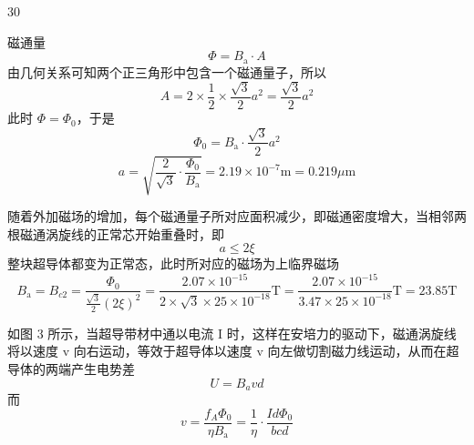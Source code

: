 \begin{solution}{30}
  \begin{subsolution}
    磁通量
    \begin{equation}
      \Phi = B_{\mathrm{a}} \cdot A
      \label{eq:1.p30}
    \end{equation}
    由几何关系可知两个正三角形中包含一个磁通量子，所以
    \begin{equation}
      A = 2 \times \frac{1}{2} \times \frac{\sqrt{3}}{2} a^{2} = \frac{\sqrt{3}}{2} a^{2}
      \label{eq:2.p30}
    \end{equation}
    此时 $\Phi = \Phi_{0}$，于是
    \begin{equation}
      \Phi_{0} = B_{\mathrm{a}} \cdot \frac{\sqrt{3}}{2} a^{2}
      \label{eq:3.p30}
    \end{equation}
    \begin{equation}
      a = \sqrt{\frac{2}{\sqrt{3}} \cdot \frac{\Phi_{0}}{B_{\mathrm{a}}}} = 2.19 \times 10^{-7} \mathrm{m} = 0.219 \mu \mathrm{m}
      \label{eq:4.p30}
    \end{equation}
  \end{subsolution}
  \begin{subsolution}
    随着外加磁场的增加，每个磁通量子所对应面积减少，即磁通密度增大，当相邻两根磁通涡旋线的正常芯开始重叠时，即
    \begin{equation}
      a \leq 2 \xi
      \label{eq:5.p30}
    \end{equation}
    整块超导体都变为正常态，此时所对应的磁场为上临界磁场
    \begin{equation}
      B_{\mathrm{a}} = B_{c 2} = \frac{\Phi_{0}}{\frac{\sqrt{3}}{2} (2 \xi)^{2}} = \frac{2.07 \times 10^{-15}}{2 \times \sqrt{3} \times 25 \times 10^{-18}} \mathrm{T} = \frac{2.07 \times 10^{-15}}{3.47 \times 25 \times 10^{-18}} \mathrm{T} = 23.85 \mathrm{T}
      \label{eq:6.p30}
    \end{equation}
  \end{subsolution}
  \begin{subsolution}
    如图 3 所示，当超导带材中通以电流 I 时，这样在安培力的驱动下，磁通涡旋线将以速度 v 向右运动，等效于超导体以速度 v 向左做切割磁力线运动，从而在超导体的两端产生电势差
    \begin{equation}
      U = B_{a} v d
      \label{eq:7.p30}
    \end{equation}
    而
    \begin{equation}
      v = \frac{f_{A} \Phi_{0}}{\eta B_{\mathrm{a}}} = \frac{1}{\eta} \cdot \frac{I d \Phi_{0}}{b c d}
      \label{eq:8.p30}

\end{equation}
\end{subsolution}
\end{solution}
